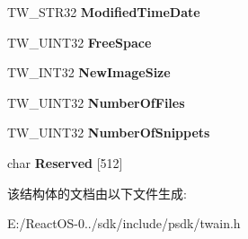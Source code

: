 \begin{DoxyCompactItemize}
T\+W\+\_\+\+S\+T\+R32 {\bfseries Modified\+Time\+Date}
\item 
\mbox{\label{struct_t_w___f_i_l_e_s_y_s_t_e_m_abbd6c45251a5da25da22c22a9dc006fe}} 
T\+W\+\_\+\+U\+I\+N\+T32 {\bfseries Free\+Space}
\item 
\mbox{\label{struct_t_w___f_i_l_e_s_y_s_t_e_m_a927ca00d7f51c354dc73b13a9bf7e53e}} 
T\+W\+\_\+\+I\+N\+T32 {\bfseries New\+Image\+Size}
\item 
\mbox{\label{struct_t_w___f_i_l_e_s_y_s_t_e_m_af79206add7d6f01938ab4ca01f0c3b35}} 
T\+W\+\_\+\+U\+I\+N\+T32 {\bfseries Number\+Of\+Files}
\item 
\mbox{\label{struct_t_w___f_i_l_e_s_y_s_t_e_m_a8b105d3a2e545d466b76c05d95ae02cd}} 
T\+W\+\_\+\+U\+I\+N\+T32 {\bfseries Number\+Of\+Snippets}
\item 
\mbox{\label{struct_t_w___f_i_l_e_s_y_s_t_e_m_a9ba36f7e95ed5771bbfcdf4e5db5d0dd}} 
char {\bfseries Reserved} \mbox{[}512\mbox{]}
\end{DoxyCompactItemize}


该结构体的文档由以下文件生成\+:\begin{DoxyCompactItemize}
\item 
E\+:/\+React\+O\+S-\/0../sdk/include/psdk/twain.\+h\end{DoxyCompactItemize}
